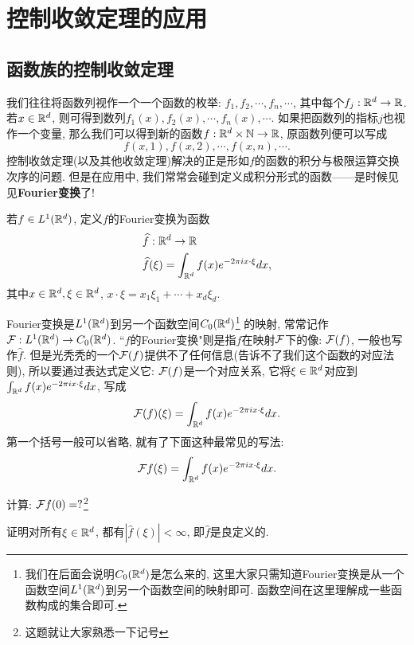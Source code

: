 \section{控制收敛定理的应用}\label{DCT}

\subsection{函数族的控制收敛定理}
我们往往将函数列视作一个一个函数的枚举: $f_1, f_2, \cdots, f_n, \cdots$, 其中每个$f_j: \mathbb{R}^d \to \mathbb{R}$. 若$x \in \mathbb{R}^d$, 则可得到数列$f_1(x), f_2(x), \cdots, f_n(x), \cdots$. 如果把函数列的指标$j$也视作一个变量, 那么我们可以得到新的函数$f: \mathbb{R}^d \times \mathbb{N} \to \mathbb{R}$, 原函数列便可以写成
$$f(x,1), f(x,2), \cdots, f(x,n), \cdots. $$
控制收敛定理(以及其他收敛定理)解决的正是形如$f$的函数的积分与极限运算交换次序的问题. 但是在应用中, 我们常常会碰到定义成积分形式的函数——是时候见见\textbf{Fourier变换}了!
\begin{definition}
    若$f \in L^1(\mathbb{R}^d)$, 定义$f$的Fourier变换为函数
    \begin{align*}
    &\widehat{f}: \mathbb{R}^d \to \mathbb{R} \\
    &\widehat{f}(\xi) = \int_{\mathbb{R}^d} f(x)e^{-2\pi ix \cdot \xi} dx,
    \end{align*}
    其中$x \in \mathbb{R}^d, \xi \in \mathbb{R}^d$, $x \cdot \xi = x_1\xi_1 + \cdots + x_d\xi_d$.
\end{definition}
\begin{remark}
    Fourier变换是$L^1(\mathbb{R}^d)$到另一个函数空间$C_0(\mathbb{R}^d)$\footnote{我们在后面会说明$C_0(\mathbb{R}^d)$是怎么来的, 这里大家只需知道Fourier变换是从一个函数空间$L^1(\mathbb{R}^d)$到另一个函数空间的映射即可. 函数空间在这里理解成一些函数构成的集合即可. }
    的映射, 常常记作$\mathcal{F}: L^1(\mathbb{R}^d) \to C_0(\mathbb{R}^d)$. ``$f$的Fourier变换"则是指$f$在映射$\mathcal{F}$下的像: $\mathcal{F}(f)$, 一般也写作$\hat{f}$. 但是光秃秃的一个$\mathcal{F}(f)$提供不了任何信息(告诉不了我们这个函数的对应法则), 所以要通过表达式定义它: $\mathcal{F}(f)$是一个对应关系, 它将$\xi \in \mathbb{R}^d$对应到
    $\int_{\mathbb{R}^d} f(x)e^{-2\pi ix \cdot \xi} dx$, 写成
    $$\mathcal{F}(f)(\xi) = \int_{\mathbb{R}^d} f(x)e^{-2\pi ix \cdot \xi} dx.$$ 第一个括号一般可以省略, 就有了下面这种最常见的写法:
    $$\mathcal{F} f(\xi) = \int_{\mathbb{R}^d} f(x)e^{-2\pi ix \cdot \xi} dx.$$
\end{remark}
\begin{exercise}
    计算: $\mathcal{F} f(0)=?$\footnote{这题就让大家熟悉一下记号}
\end{exercise}
\begin{exercise}
    证明对所有$\xi \in \mathbb{R}^d$, 都有$|\hat{f}(\xi)|<\infty$, 即$\hat{f}$是良定义的.
\end{exercise}

